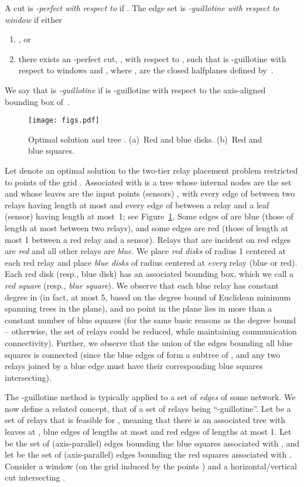 \documentclass[11pt,a4paper]{article}
\theoremstyle{definition}
\theoremstyle{remark}
\begin{document}
\begin{enumerate}
A cut  is {\em -perfect with respect to } if
.  The edge set  is {\em -guillotine
  with respect to window } if either
\begin{enumerate}
    \item , or
    \item there exists an -perfect cut, , with respect to
      , such that  is -guillotine with respect to windows
       and , where ,  are the closed
      halfplanes defined by~.
\end{enumerate}
We say that  is {\em -guillotine} if  is -guillotine with
respect to the axis-aligned bounding box of~.

\begin{figure}\centering
\texttt{[image: figs.pdf]}
\caption{Optimal solution  and tree . (a)~Red and blue disks. (b)~Red and blue squares.}\label{fig:redblue}
\end{figure}

Let  denote an optimal solution to the two-tier relay placement
problem restricted to points of the grid .  Associated with 
is a tree  whose internal nodes are the set  and whose
leaves are the  input points (sensors) , with every edge of
 between two relays having length at most  and every edge of
 between a relay and a leaf (sensor) having length at most~1; see Figure~\ref{fig:redblue}.
Some edges of  are blue (those of length at most  between two
relays), and some edges are red (those of length at most 1 between a
red relay and a sensor).  Relays that are incident on red edges are
{\em red} and all other relays are {\em blue}.  We place {\em red
  disks} of radius 1 centered at each red relay and place {\em blue
  disks} of radius  centered at {\em every} relay (blue or red).
Each red disk (resp., blue disk) has an associated bounding box, which
we call a {\em red square} (resp., {\em blue square}).  We observe
that each blue relay has constant degree in  (in fact, at most 5,
based on the degree bound of Euclidean minimum spanning trees in the
plane), and no point in the plane lies in more than a constant number
of blue squares (for the same basic reasons as the degree bound --
otherwise, the set of relays could be reduced, while maintaining
communication connectivity).  Further, we observe that the union of
the edges bounding all blue squares is connected (since the blue edges
of  form a subtree of , and any two relays joined by a blue
edge must have their corresponding blue squares intersecting).

The -guillotine method is typically applied to a set of {\em edges}
of some network.  We now define a related concept, that of a set of
relays being ``-guillotine''.  Let  be a set of
relays that is feasible for , meaning that there is an associated
tree  with leaves at , blue edges of lengths at most  and red
edges of lengths at most 1.  Let  be the set of (axis-parallel)
edges bounding the blue squares associated with , and let  be
the set of (axis-parallel) edges bounding the red squares associated
with .  Consider a window  (on the grid induced by the points
) and a horizontal/vertical cut  intersecting .


\end{enumerate}
\end{document}
